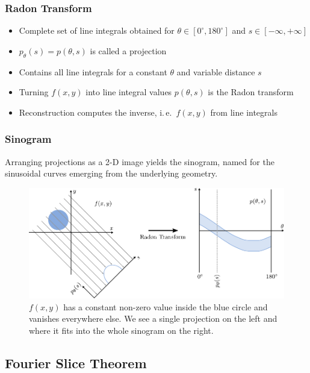 \begin{frame}
\end{frame}

\begin{frame}
	\frametitle{Radon Transform}

	\begin{itemize}
		\setlength\itemsep{0.3cm}
		\item Complete set of line integrals obtained for $\theta \in [0^\circ, 180^\circ]$ and $s \in [-\infty, +\infty]$
		\item $p_{\theta}(s) = p(\theta,s)$ is called a projection
		\item Contains all line integrals for a constant $\theta$ and variable distance $s$
		\item Turning $f(x,y)$ into line integral values $p(\theta, s)$ is the Radon transform
		\item Reconstruction computes the inverse, i.\,e.~$f(x,y)$ from line integrals

	\end{itemize}

\end{frame}

\begin{frame}
	\frametitle{Sinogram}

	Arranging projections as a 2-D image yields the sinogram, named for the sinusoidal curves emerging from the underlying geometry.

	\begin{figure}[tbp]
		\centering
		\includegraphics[width=0.75\linewidth]{images/radon_2}
		\caption{$f(x, y)$ has a constant non-zero value inside the blue circle and vanishes everywhere else. We see a single projection on the left and where it fits into the whole sinogram on the right.}%
		\label{fig:ct_radon_2}
	\end{figure}

\end{frame}

\subsection{Fourier Slice Theorem}%
\label{sub:ct_fourier}

